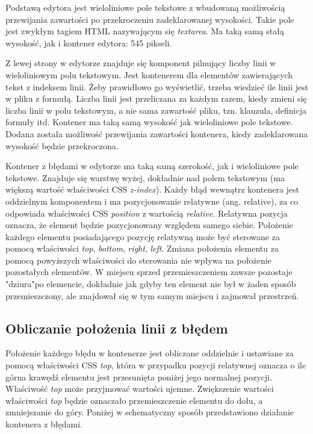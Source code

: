 \documentclass[a4paper,12pt]{book}
\theoremstyle{definition}
\begin{document}
Podstawą edytora jest wieloliniowe pole tekstowe z wbudowaną możliwością przewijania zawartości po przekroczeniu zadeklarowanej wysokości. Takie pole jest zwykłym tagiem HTML nazywającym się \textit{textarea}. Ma taką samą stałą wysokość, jak i kontener edytora: 545 pikseli.

Z lewej strony w edytorze znajduje się komponent pilnujący liczby linii w wieloliniowym polu tekstowym. Jest kontenerem dla elementów zawierających tekst z indeksem linii. Żeby prawidłowo go wyświetlić, trzeba wiedzieć ile linii jest w pliku z formułą. Liczba linii jest przeliczana za każdym razem, kiedy zmieni się liczba linii w polu tekstowym, a nie sama zawartość pliku, tzn. klauzula, definicja formuły itd. Kontener ma taką samą wysokość jak wieloliniowe pole tekstowe. Dodana została możliwość przewijania zawartości kontenera, kiedy zadeklarowana wysokość będzie przekroczona.
 
Kontener z błędami w edytorze ma taką samą szerokość, jak i wieloliniowe pole tekstowe. Znajduje się warstwę wyżej, dokładnie nad polem tekstowym (ma większą wartość właściwości CSS \textit{z-index}). Każdy błąd wewnątrz kontenera jest oddzielnym komponentem i ma pozycjonowanie relatywne (ang. relative), za co odpowiada właściwości CSS \textit{position} z wartością \textit{relative}. Relatywna pozycja oznacza, że element będzie pozycjonowany względem samego siebie. Położenie każdego elementu posiadającego pozycję relatywną może być sterowane za pomocą właściwości \textit{top}, \textit{bottom}, \textit{right}, \textit{left}. Zmiana położenia elementu za pomocą powyższych właściwości do sterowania nie wpływa na położenie pozostałych elementów. W miejscu sprzed przemieszczeniem zawsze pozostaje "dziura"\;po elemencie, dokładnie jak gdyby ten element nie był w żaden sposób przemieszczony, ale znajdował się w tym samym miejscu i zajmował przestrzeń.

\subsection{Obliczanie położenia linii z błędem}

Położenie każdego błędu w kontenerze jest obliczane oddzielnie i ustawiane za pomocą właściwości CSS \textit{top}, która w przypadku pozycji relatywnej oznacza o ile górna krawędź elementu jest przesunięta poniżej jego normalnej pozycji. Właściwość \textit{top} może przyjmować wartości ujemne. Zwiększenie wartości właściwości \textit{top} będzie oznaczało przemieszczenie elementu do dołu, a zmniejszanie do góry. Poniżej w schematyczny sposób przedstawiono działanie kontenera z błędami.
\end{document}
